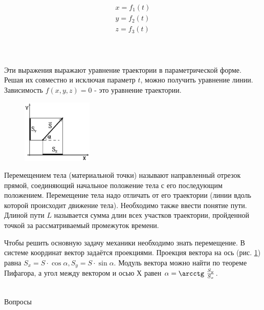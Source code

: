 \documentclass[a6paper, 11pt]{diss_4}
\renewcommand{\'}{\,'}
\begin{document}
\begin{gather*}
x=f_1(t)\\
y=f_2(t)\\
z=f_3(t)
\end{gather*}
\\
\\
\\

  Эти выражения выражают уравнение траектории в параметрической форме.
Решая их совместно и исключая параметр $t$, можно получить уравнение линии.
Зависимость $f(x,y,z)=0$ - это уравнение траектории.\\

\begin{figure}
\includegraphics[width=0.3\textwidth]{img/img06.eps}
\caption{}
\label{fig6}
\end{figure}
  Перемещением тела (материальной точки) называют направленный отрезок
прямой, соединяющий начальное положение тела с его последующим положением.
Перемещение тела надо отличать от его траектории (линии вдоль которой
происходит движение тела). Необходимо также ввести понятие пути. Длиной пути $L$
называется сумма длин всех участков траектории, пройденной точкой за
рассматриваемый промежуток времени.

  Чтобы решить основную задачу механики необходимо знать перемещение. В
системе координат вектор задаётся проекциями. Проекция вектора на ось (рис. \ref{fig6}) равна
$S_x=S\cdot \cos\alpha, S_y=S\cdot \sin\alpha$. Модуль вектора можно найти по
теореме Пифагора, а угол между вектором и осью $Х$ равен $\alpha=\arcctg\ \frac{S_y}{S_x}$.
\\
\\

\begin{center}
   Вопросы
\end{center}
\end{document}
